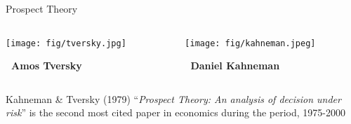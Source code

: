 \documentclass{beamer}
\begin{document}
\begin{frame}{Prospect Theory}

\begin{columns}
 \begin{column}{0.35\textwidth}

\texttt{[image: fig/tversky.jpg]}  

\textbf{~Amos Tversky}
 \end{column}

 \begin{column}{0.35\textwidth}

\texttt{[image: fig/kahneman.jpeg]}  

\textbf{~Daniel Kahneman}
 \end{column}
\end{columns}

\vspace{7ex}

\begin{scriptsize}
  Kahneman \& Tversky (1979) ``\textit{Prospect Theory: An analysis of decision under risk}'' is the second most cited paper in economics during the period, 1975-2000 
\end{scriptsize}

\end{frame}
\end{document}
